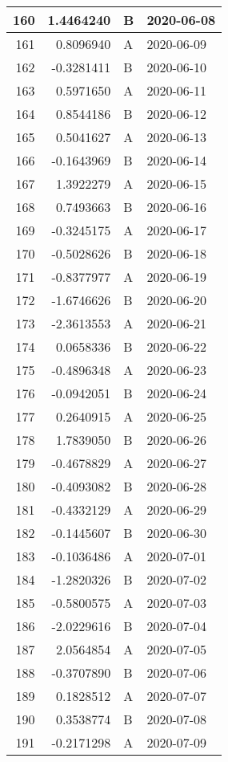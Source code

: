 \begin{tabular}{r|r|l|l}
\hline
160 & 1.4464240 & B & 2020-06-08\\
\hline
161 & 0.8096940 & A & 2020-06-09\\
\hline
162 & -0.3281411 & B & 2020-06-10\\
\hline
163 & 0.5971650 & A & 2020-06-11\\
\hline
164 & 0.8544186 & B & 2020-06-12\\
\hline
165 & 0.5041627 & A & 2020-06-13\\
\hline
166 & -0.1643969 & B & 2020-06-14\\
\hline
167 & 1.3922279 & A & 2020-06-15\\
\hline
168 & 0.7493663 & B & 2020-06-16\\
\hline
169 & -0.3245175 & A & 2020-06-17\\
\hline
170 & -0.5028626 & B & 2020-06-18\\
\hline
171 & -0.8377977 & A & 2020-06-19\\
\hline
172 & -1.6746626 & B & 2020-06-20\\
\hline
173 & -2.3613553 & A & 2020-06-21\\
\hline
174 & 0.0658336 & B & 2020-06-22\\
\hline
175 & -0.4896348 & A & 2020-06-23\\
\hline
176 & -0.0942051 & B & 2020-06-24\\
\hline
177 & 0.2640915 & A & 2020-06-25\\
\hline
178 & 1.7839050 & B & 2020-06-26\\
\hline
179 & -0.4678829 & A & 2020-06-27\\
\hline
180 & -0.4093082 & B & 2020-06-28\\
\hline
181 & -0.4332129 & A & 2020-06-29\\
\hline
182 & -0.1445607 & B & 2020-06-30\\
\hline
183 & -0.1036486 & A & 2020-07-01\\
\hline
184 & -1.2820326 & B & 2020-07-02\\
\hline
185 & -0.5800575 & A & 2020-07-03\\
\hline
186 & -2.0229616 & B & 2020-07-04\\
\hline
187 & 2.0564854 & A & 2020-07-05\\
\hline
188 & -0.3707890 & B & 2020-07-06\\
\hline
189 & 0.1828512 & A & 2020-07-07\\
\hline
190 & 0.3538774 & B & 2020-07-08\\
\hline
191 & -0.2171298 & A & 2020-07-09\\

\end{tabular}
